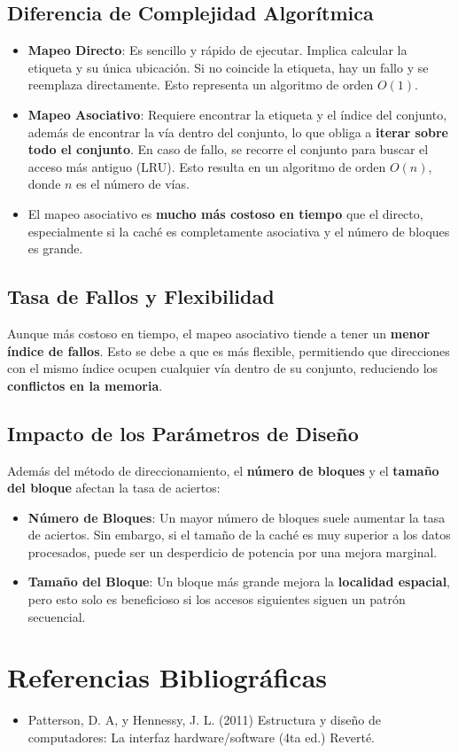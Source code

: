 \documentclass{article}
\begin{document}
\subsection{Diferencia de Complejidad Algorítmica}
\begin{itemize}
    \item \textbf{Mapeo Directo}: Es sencillo y rápido de ejecutar. Implica calcular la etiqueta y su única ubicación. Si no coincide la etiqueta, hay un fallo y se reemplaza directamente. Esto representa un algoritmo de orden \textbf{$O(1)$}.
    \item \textbf{Mapeo Asociativo}: Requiere encontrar la etiqueta y el índice del conjunto, además de encontrar la vía dentro del conjunto, lo que obliga a \textbf{iterar sobre todo el conjunto}. En caso de fallo, se recorre el conjunto para buscar el acceso más antiguo (LRU). Esto resulta en un algoritmo de orden \textbf{$O(n)$}, donde $n$ es el número de vías.
    \item El mapeo asociativo es \textbf{mucho más costoso en tiempo} que el directo, especialmente si la caché es completamente asociativa y el número de bloques es grande.
\end{itemize}

\subsection{Tasa de Fallos y Flexibilidad}
Aunque más costoso en tiempo, el mapeo asociativo tiende a tener un \textbf{menor índice de fallos}. Esto se debe a que es más flexible, permitiendo que direcciones con el mismo índice ocupen cualquier vía dentro de su conjunto, reduciendo los \textbf{conflictos en la memoria}.

\subsection{Impacto de los Parámetros de Diseño}
Además del método de direccionamiento, el \textbf{número de bloques} y el \textbf{tamaño del bloque} afectan la tasa de aciertos:
\begin{itemize}
    \item \textbf{Número de Bloques}: Un mayor número de bloques suele aumentar la tasa de aciertos. Sin embargo, si el tamaño de la caché es muy superior a los datos procesados, puede ser un desperdicio de potencia por una mejora marginal.
    \item \textbf{Tamaño del Bloque}: Un bloque más grande mejora la \textbf{localidad espacial}, pero esto solo es beneficioso si los accesos siguientes siguen un patrón secuencial.
\end{itemize}

\section{Referencias Bibliográficas}
\begin{itemize}
    \item Patterson, D. A, y Hennessy, J. L. (2011) Estructura y diseño de computadores: La interfaz hardware/software (4ta ed.) Reverté.
\end{itemize}
\end{document}
